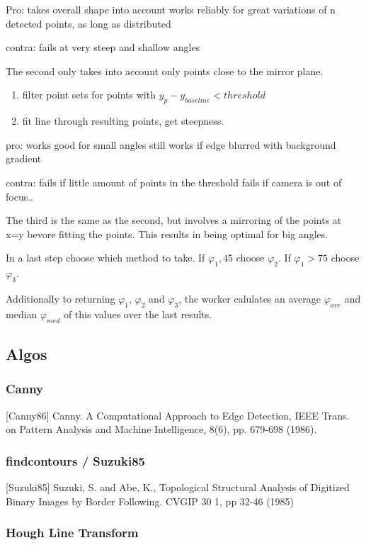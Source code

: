 Pro:
takes overall shape into account
works reliably for great variations of n detected points, as long as distributed

contra:
fails at very steep and shallow angles


The second only takes into account only points close to the mirror plane.
\begin{enumerate}
  \item filter point sets for points with $y_p - y_{baseline}< threshold$
  \item fit line through resulting points, get steepness.
\end{enumerate}


pro:
works good for small angles
still works if edge blurred with background gradient

contra:
fails if little amount of points in the threshold
fails if camera is out of focus..


The third is the same as the second, but involves a mirroring of the points at x=y bevore fitting the points.
This results in being optimal for big angles.


In a last step choose which method to take.
If $\varphi_1,45$ choose $\varphi_2$.
If $\varphi_1>75$ choose $\varphi_3$.


Additionally to returning $\varphi_1$, $\varphi_2$ and $\varphi_3$, the worker calulates an average $\varphi_{ave}$ and median $\varphi_{med}$ of this values over the  last results.


\subsection{Algos}

\subsubsection{Canny}
[Canny86]  Canny. A Computational Approach to Edge Detection, IEEE Trans. on Pattern Analysis and Machine Intelligence, 8(6), pp. 679-698 (1986).


\subsubsection{findcontours / Suzuki85}
[Suzuki85] Suzuki, S. and Abe, K., Topological Structural Analysis of Digitized Binary Images by Border Following. CVGIP 30 1, pp 32-46 (1985)



\subsubsection{Hough Line Transform}

